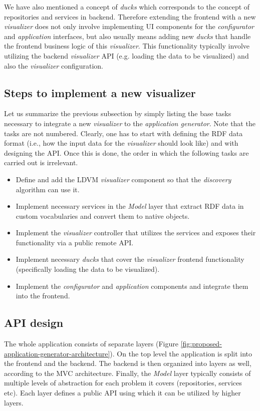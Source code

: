 We have also mentioned a concept of \emph{ducks} which corresponds to the concept of repositories and services in backend. Therefore extending the frontend with a new \emph{visualizer} does not only involve implementing UI components for the \emph{configurator}  and \emph{application} interfaces, but also usually means adding new \emph{ducks} that handle the frontend business logic of this \emph{visualizer}. This functionality typically involve utilizing the backend \emph{visualizer} API (e.g. loading the data to be visualized) and also the \emph{visualizer} configuration.

\subsection{Steps to implement a new visualizer}

Let us summarize the previous subsection by simply listing the base tasks necessary to integrate a new \emph{visualizer} to the \emph{application generator}. Note that the tasks are not numbered. Clearly, one has to start with defining the RDF data format (i.e., how the input data for the \emph{visualizer} should look like) and with designing the API. Once this is done, the order in which the following tasks are carried out is irrelevant.

\begin{itemize}
\item Define and add the LDVM \emph{visualizer} component so that the \emph{discovery} algorithm can use it.
\item Implement necessary services in the \emph{Model} layer that extract RDF data in custom vocabularies and convert them to native objects.
\item Implement the \emph{visualizer} controller that utilizes the services and exposes their functionality via a public remote API.
\item Implement necessary \emph{ducks} that cover the \emph{visualizer} frontend functionality (specifically loading the data to be visualized).
\item Implement the \emph{configurator} and \emph{application} components and integrate them into the frontend. 
\end{itemize}

\subsection{API design}

The whole application consists of separate layers (Figure \ref{fig:proposed-application-generator-architecture}). On the top level the application is split into the frontend and the backend. The backend is then organized into layers as well, according to the MVC architecture. Finally, the \emph{Model} layer typically consists of multiple levels of abstraction for each problem it covers (repositories, services etc). Each layer defines a public API using which it can be utilized by higher layers.


